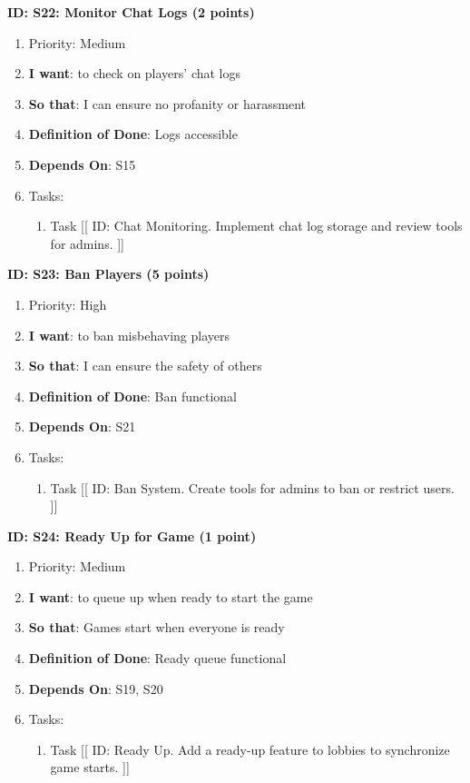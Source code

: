 \textbf{ID: S22: Monitor Chat Logs (2 points)}
\begin{enumerate}
    \item Priority: Medium
    \item \textbf{I want}: to check on players' chat logs
    \item \textbf{So that}: I can ensure no profanity or harassment
    \item \textbf{Definition of Done}: Logs accessible
    \item \textbf{Depends On}: S15
    \item Tasks:
    \begin{enumerate}
        \item Task [[ ID: Chat Monitoring. Implement chat log storage and review tools for admins. ]]
    \end{enumerate}
\end{enumerate}

\textbf{ID: S23: Ban Players (5 points)}
\begin{enumerate}
    \item Priority: High
    \item \textbf{I want}: to ban misbehaving players
    \item \textbf{So that}: I can ensure the safety of others
    \item \textbf{Definition of Done}: Ban functional
    \item \textbf{Depends On}: S21
    \item Tasks:
    \begin{enumerate}
        \item Task [[ ID: Ban System. Create tools for admins to ban or restrict users. ]]
    \end{enumerate}
\end{enumerate}

\textbf{ID: S24: Ready Up for Game (1 point)}
\begin{enumerate}
    \item Priority: Medium
    \item \textbf{I want}: to queue up when ready to start the game
    \item \textbf{So that}: Games start when everyone is ready
    \item \textbf{Definition of Done}: Ready queue functional
    \item \textbf{Depends On}: S19, S20
    \item Tasks:
    \begin{enumerate}
        \item Task [[ ID: Ready Up. Add a ready-up feature to lobbies to synchronize game starts. ]]
    \end{enumerate}
\end{enumerate}

